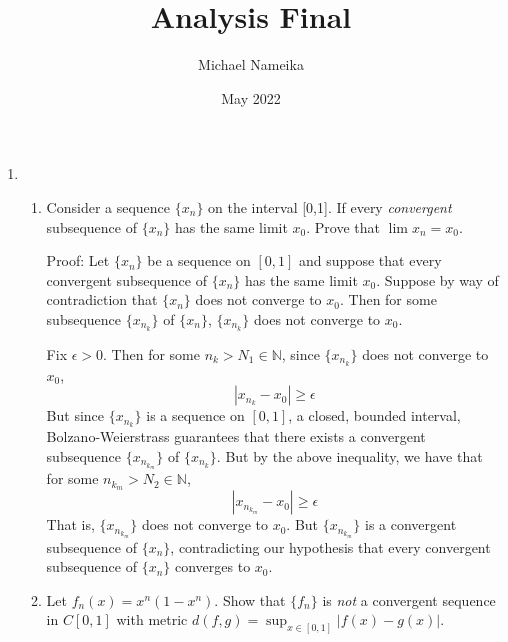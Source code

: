 \documentclass{article}
\title{Analysis Final}
\author{Michael Nameika}
\date{May 2022}
\begin{document}
\maketitle
\begin{enumerate}
    \item \begin{enumerate}
        \item Consider a sequence $\{x_n\}$ on the interval [0,1]. If every \textit{convergent} subsequence of $\{x_n\}$ has the same limit $x_0$. Prove that $\lim x_n = x_0$.
        \newline
        
        Proof: Let $\{x_n\}$ be a sequence on $[0,1]$ and suppose that every convergent subsequence of $\{x_n\}$ has the same limit $x_0$. Suppose by way of contradiction that $\{x_n\}$ does not converge to $x_0$. Then for some subsequence $\{x_{n_{k}}\}$ of $\{x_n\}$, $\{x_{n_k}\}$ does not converge to $x_0$. 
        
        Fix $\epsilon > 0$. Then for some $n_k > N_1 \in \mathbb{N}$, since $\{x_{n_k}\}$ does not converge to $x_0$,
        \[|x_{n_k} - x_0| \geq \epsilon\]
        But since $\{x_{n_k}\}$ is a sequence on $[0,1]$, a closed, bounded interval, Bolzano-Weierstrass guarantees that there exists a convergent subsequence $\{x_{n_{k_m}}\}$ of $\{x_{n_k}\}$. But by the above inequality, we have that for some $n_{k_m} > N_2 \in \mathbb{N}$, 
        \[|x_{n_{k_m}} - x_0| \geq \epsilon\]
        That is, $\{x_{n_{k_m}}\}$ does not converge to $x_0$. But $\{x_{n_{k_m}}\}$ is a convergent subsequence of $\{x_n\}$, contradicting our hypothesis that every convergent subsequence of $\{x_n\}$ converges to $x_0$.
        
        \item Let $f_n(x) = x^n(1 - x^n)$. Show that $\{f_n\}$ is \textit{not} a convergent sequence in $C[0,1]$ with metric $d(f,g) = \sup_{x \in [0,1]}|f(x) - g(x)|$.
        \newline
        

\end{enumerate}
\end{enumerate}
\end{document}
